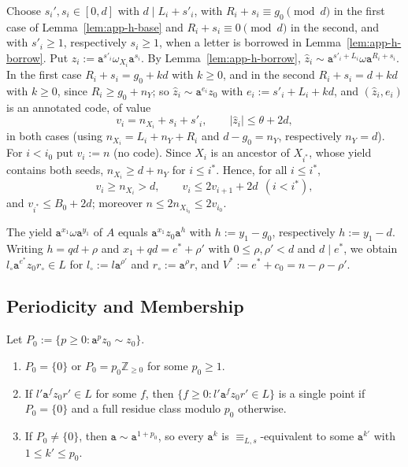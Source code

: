 Choose $s_i',s_i\in[0,d]$ with $d\mid L_i+s'_i$, with $R_i+s_i\equiv g_0\pmod d$
in the first case of Lemma~\ref{lem:app-h-base} and $R_i+s_i\equiv0\pmod d$ in
the second, and with $s'_i\ge1$, respectively $s_i\ge1$, when a letter is
borrowed in Lemma~\ref{lem:app-h-borrow}.  Put $\hat z_i:=\mathtt
a^{s'_i}\omega_{X_i}\mathtt a^{s_i}$.  By Lemma~\ref{lem:app-h-borrow},
$\hat z_i\sim\mathtt a^{s'_i+L_i}\omega\mathtt a^{R_i+s_i}$.  In the first case
$R_i+s_i=g_0+kd$ with $k\ge0$, and in the second $R_i+s_i=d+kd$ with $k\ge0$,
since $R_i\ge g_0+n_Y$; so $\hat z_i\sim\mathtt a^{e_i}z_0$ with
$e_i:=s'_i+L_i+kd$, and $(\hat z_i,e_i)$ is an annotated code, of value
\[
 v_i=n_{X_i}+s_i+s'_i,\qquad|\hat z_i|\le\theta+2d,
\]
in both cases (using $n_{X_i}=L_i+n_Y+R_i$ and $d-g_0=n_Y$, respectively
$n_Y=d$).  For $i<i_0$ put $v_i:=n$ (no code).  Since $X_i$ is an ancestor of
$X_{i^*}$, whose yield contains both seeds, $n_{X_i}\ge d+n_Y$ for $i\le i^*$.
Hence, for all $i\le i^*$,
\begin{equation}
\label{eq:app-h-star}
 v_i\ge n_{X_i}>d,\qquad v_i\le2v_{i+1}+2d\ \ (i<i^*),
\end{equation}
and $v_{i^*}\le B_0+2d$; moreover $n\le2n_{X_{i_0}}\le2v_{i_0}$.

The yield $\mathtt a^{x_1}\omega\mathtt a^{y_1}$ of $A$ equals $\mathtt
a^{x_1}z_0\mathtt a^{h}$ with $h:=y_1-g_0$, respectively $h:=y_1-d$.  Writing
$h=qd+\rho$ and $x_1+qd=e^*+\rho'$ with $0\le\rho,\rho'<d$ and $d\mid e^*$, we
obtain $l_\circ\mathtt a^{e^*}z_0r_\circ\in L$ for $l_\circ:=l\mathtt a^{\rho'}$
and $r_\circ:=\mathtt a^\rho r$, and $V^*:=e^*+c_0=n-\rho-\rho'$.

\subsection{Periodicity and Membership}

\begin{lemma}
\label{lem:app-h-period}
Let $P_0:=\{p\ge0:\mathtt a^pz_0\sim z_0\}$.
\begin{enumerate}[label=\textup{(\roman*)},leftmargin=*]
\item $P_0=\{0\}$ or $P_0=p_0\mathbb Z_{\ge0}$ for some $p_0\ge1$.
\item If $l'\mathtt a^fz_0r'\in L$ for some $f$, then
$\{f\ge0:l'\mathtt a^fz_0r'\in L\}$ is a single point if $P_0=\{0\}$ and a
full residue class modulo $p_0$ otherwise.
\item If $P_0\ne\{0\}$, then $\mathtt a\sim\mathtt a^{1+p_0}$, so every
$\mathtt a^k$ is $\equiv_{L,s}$-equivalent to some $\mathtt a^{k'}$ with $1\le k'\le p_0$.
\end{enumerate}
\end{lemma}

